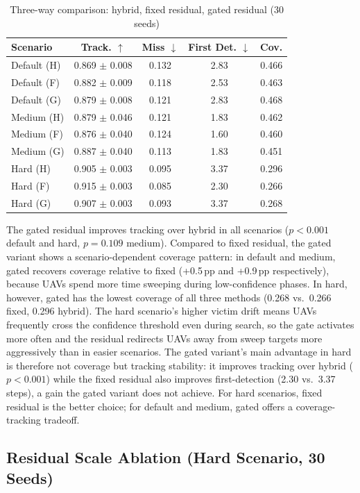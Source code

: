 \documentclass[conference]{IEEEtran}
\begin{document}
\begin{table}[t]
\centering
\caption{Three-way comparison: hybrid, fixed residual, gated residual (30 seeds)}
\small
\begin{tabular}{@{}lcccc@{}}
\toprule
Scenario & Track. $\uparrow$ & Miss $\downarrow$ & First Det. $\downarrow$ & Cov. \\
\midrule
Default (H) & 0.869 $\pm$ 0.008 & 0.132 & 2.83 & 0.466 \\
Default (F) & 0.882 $\pm$ 0.009 & 0.118 & 2.53 & 0.463 \\
Default (G) & 0.879 $\pm$ 0.008 & 0.121 & 2.83 & 0.468 \\
\midrule
Medium (H)  & 0.879 $\pm$ 0.046 & 0.121 & 1.83 & 0.462 \\
Medium (F)  & 0.876 $\pm$ 0.040 & 0.124 & 1.60 & 0.460 \\
Medium (G)  & 0.887 $\pm$ 0.040 & 0.113 & 1.83 & 0.451 \\
\midrule
Hard (H)    & 0.905 $\pm$ 0.003 & 0.095 & 3.37 & 0.296 \\
Hard (F)    & 0.915 $\pm$ 0.003 & 0.085 & 2.30 & 0.266 \\
Hard (G)    & 0.907 $\pm$ 0.003 & 0.093 & 3.37 & 0.268 \\
\bottomrule
\end{tabular}
\end{table}

The gated residual improves tracking over hybrid in all scenarios ($p < 0.001$ default
and hard, $p = 0.109$ medium). Compared to fixed residual, the gated variant shows
a scenario-dependent coverage pattern: in default and medium, gated recovers coverage
relative to fixed (+0.5\,pp and +0.9\,pp respectively), because UAVs spend more time
sweeping during low-confidence phases. In hard, however, gated has the lowest coverage
of all three methods (0.268 vs.\ 0.266 fixed, 0.296 hybrid). The hard scenario's higher
victim drift means UAVs frequently cross the confidence threshold even during search,
so the gate activates more often and the residual redirects UAVs away from sweep targets
more aggressively than in easier scenarios. The gated variant's main advantage in hard
is therefore not coverage but tracking stability: it improves tracking over hybrid
($p < 0.001$) while the fixed residual also improves first-detection (2.30 vs.\ 3.37
steps), a gain the gated variant does not achieve. For hard scenarios, fixed residual
is the better choice; for default and medium, gated offers a coverage-tracking tradeoff.

\subsection{Residual Scale Ablation (Hard Scenario, 30 Seeds)}
\end{document}
